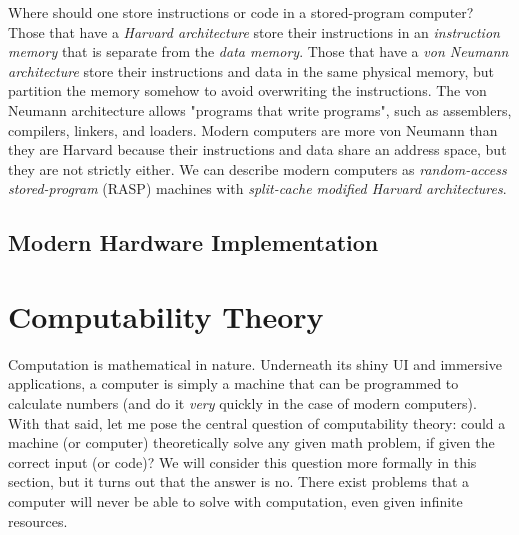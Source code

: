 Where should one store instructions or code in a stored-program computer? Those that have a \textit{Harvard architecture} store their instructions in an \textit{instruction memory} that is separate from the \textit{data memory}. Those that have a \textit{von Neumann architecture} store their instructions and data in the same physical memory, but partition the memory somehow to avoid overwriting the instructions. The von Neumann architecture allows "programs that write programs", such as assemblers, compilers, linkers, and loaders. Modern computers are more von Neumann than they are Harvard because their instructions and data share an address space, but they are not strictly either. We can describe modern computers as \textit{random-access stored-program} (RASP) machines with \textit{split-cache modified Harvard architectures}. \\


\subsection{Modern Hardware Implementation}


	

\toclineskip
\section{Computability Theory}


Computation is mathematical in nature. Underneath its shiny UI and immersive applications, a computer is simply a machine that can be programmed to calculate numbers (and do it \textit{very} quickly in the case of modern computers). With that said, let me pose the central question of computability theory: could a machine (or computer) theoretically solve any given math problem, if given the correct input (or code)? We will consider this question more formally in this section, but it turns out that the answer is no. There exist problems that a computer will never be able to solve with computation, even given infinite resources. \\

